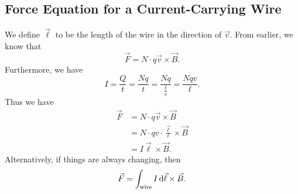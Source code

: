 \documentclass[class=article, crop=false]{standalone}
\begin{document}
  \subsection{Force Equation for a Current-Carrying Wire}
  We define $\vec{\ell}$ to be the length of the wire in the direction of $\vec{v}$. From earlier, we know that
  \[
    \vec{F} = N\cdot q\vec{v}\times \vec{B}.
  \]
  Furthermore, we have
  \[
    I = \frac{Q}{t} = \frac{Nq}{t} = \frac{Nq}{\frac{\ell}{v}} = \frac{Nqv}{\ell}.
  \]
  Thus we have
  \begin{align*}
    \vec{F} &= N\cdot q\vec{v}\times \vec{B} \\
            &= N\cdot qv\cdot \frac{\vec{\ell}}{\ell}\times \vec{B} \\
            &= I\vec{\ell}\times \vec{B}.
  \end{align*}
  Alternatively, if things are always changing, then
  \[
    \vec{F} = \int_{\text{wire}} I \,\mathrm{d}\vec{\ell}\times \vec{B}.
  \]
\end{document}
